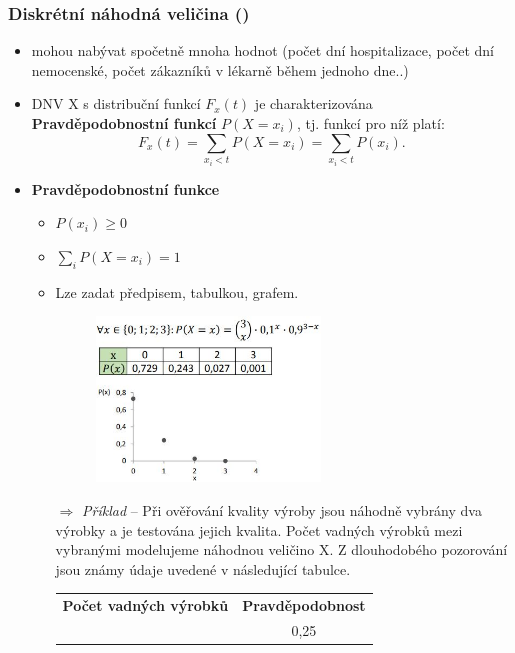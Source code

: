 \subsubsection{Diskrétní náhodná veličina ()}
\begin{itemize}
		\item mohou nabývat spočetně mnoha hodnot (počet dní hospitalizace, počet dní nemocenské, počet zákazníků v lékarně během jednoho dne..) 
		\item DNV X s distribuční funkcí $F_x(t)$ je charakterizována \textbf{Pravděpodobnostní funkcí} $P(X = x_i)$, tj. funkcí pro níž platí:
				\begin{equation*}
					F_x(t) = \sum_{x_i<t}P(X = x_i)= \sum_{x_i<t}P(x_i).
				\end{equation*}

		\item \textbf{Pravděpodobnostní funkce} 
			\begin{itemize}
				\item $P(x_i) \geq 0$
				\item $\sum_i P(X = x_i) = 1$
				\item Lze zadat předpisem, tabulkou, grafem.
				\begin{figure}[H]
					\centering
					\includegraphics[width=0.6\textwidth]{assets/11_dnv_prav}
				\end{figure}
				\item[$\Rightarrow$] \textit{Příklad} -- Při ověřování kvality výroby jsou náhodně vybrány dva výrobky a je testována jejich kvalita. Počet vadných výrobků mezi vybranými modelujeme náhodnou veličino X. Z dlouhodobého pozorování jsou známy údaje uvedené v následující tabulce.
				\begin{table}[H]
					\centering
					\begin{tabular}{c|c}
						\textbf{Počet vadných výrobků}            & \textbf{Pravděpodobnost} \\\hhline
						0      &   0,25      \\ 

\end{tabular}
\end{table}
\end{itemize}
\end{itemize}
